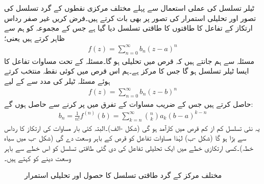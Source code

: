 ٹیلر تسلسل کی عملی استعمال سے پہلے مختلف مرکزی نقطوں کے گرد تسلسل کی تصور  اور تحلیلی استمرار کی تصور  پر بھی بات کرتے ہیں۔فرض کریں غیر صفر رداس ارتکاز  کے تفاعل  کا  طاقتوں کا طاقتی تسلسل  دیا گیا ہے جس کے مجموعہ کو ہم  سے ظاہر کرتے ہیں یعنی؛
\begin{align}\label{مساوات_ٹیلر_دیا_گیا_الف}
f(z)=\sum\limits_{n=0}^{\infty} b_n(z-a)^n
\end{align}
مسئلہ  سے ہم جانتے ہیں کہ  قرص  میں  تحلیلی ہو گا۔مسئلہ  کے تحت مساوات  تفاعل  کا ایسا ٹیلر تسلسل ہو گا جس کا مرکز  ہے۔ہم اس قرص میں کوئی نقطہ  منتخب کرتے ہوئے مسئلہ ٹیلر کی مدد سے   کے لیے 
\begin{align}\label{مساوات_ٹیلر_دیا_گیا_ب}
f(z)=\sum\limits_{n=0}^{\infty} b_n(z-b)^n
\end{align}
حاصل کرتے ہیں جس کے  ضریب   مساوات  کے تفرق میں  پر کرنے سے حاصل ہوں گے:
\begin{align*}
b_n=\frac{1}{n!}f^{(n)}(b)=\sum\limits_{k=n}^{\infty} \binom{ n}{k} a_k (b-a)^{k-n}
\end{align*}
یہ نئی تسلسل کم از کم قرص  میں کارآمد ہو گی (شکل -الف)۔البتہ کئی بار مساوات  کی ارتکاز کا رداس  سے بڑا ہو گا  (شکل -ب) لہٰذا  مساوات  تفاعل  کو  قرص  کے باہر وسعت دے گی (شکل -ب میں سیاہ خطہ)۔کسی ارتکازی خطے میں ایک تحلیلی تفاعل کی دی گئی طاقتی تسلسل  کو اس خطے سے باہر وسعت دینے کو  کہتے ہیں۔
\begin{figure}
\centering
\begin{subfigure}{0.45\textwidth}
\centering
{}
\caption{}
\end{subfigure} \hfill
\begin{subfigure}{0.45\textwidth}
\centering
{}
\caption{}
\end{subfigure} \hfill
\caption{مختلف مرکز کے گرد طاقتی تسلسل کا حصول اور تحلیلی استمرار}
\label{شکل_ٹیلر_مختلف_مرکز_تسلسل}
\end{figure}

